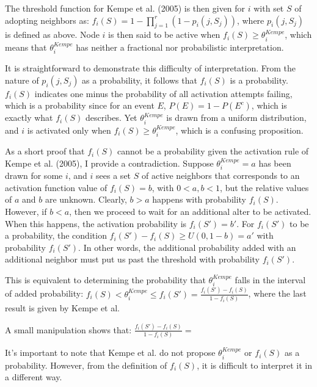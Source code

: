 \documentclass{article}
\begin{document}
The threshold function for Kempe et al. (2005) is then given for $i$ with set $S$ of adopting neighbors as: $f_i(S) = 1 - \prod_{j=1}^r (1 - p_i(j, S_j))$, where $p_i(j, S_j)$ is defined as above. Node $i$ is then said to be active when $f_i(S) \ge \theta_i^{Kempe}$, which means that $\theta_i^{Kempe}$ has neither a fractional nor probabilistic interpretation.

It is straightforward to demonstrate this difficulty of interpretation. From the nature of $p_i(j,S_j)$ as a probability, it follows that $f_i(S)$ is a probability. $f_i(S)$ indicates one minus the probability of all activation attempts failing, which is a probability since for an event $E$, $P(E) = 1 - P(E^c)$, which is exactly what $f_i(S)$ describes. Yet $\theta_i^{Kempe}$ is drawn from a uniform distribution, and $i$ is activated only when $f_i(S) \ge \theta_i^{Kempe}$, which is a confusing proposition.

As a short proof that $f_i(S)$ cannot be a probability given the activation rule of Kempe et al. (2005), I provide a contradiction. Suppose $\theta_i^{Kempe} = a$ has been drawn for some $i$, and $i$ sees a set $S$ of active neighbors that corresponds to an activation function value of $f_i(S) = b$, with $0 < a, b < 1$, but the relative values of $a$ and $b$ are unknown. Clearly, $b \gt a$ happens with probability $f_i(S)$. However, if $b < a$, then we proceed to wait for an additional alter to be activated. When this happens, the activation probability is $f_i(S') = b'$. For $f_i(S')$ to be a probability, the condition $f_i(S') - f_i(S) \ge U(0, 1-b) = a'$ with probability $f_i(S')$. In other words, the additional probability added with an additional neighbor must put us past the threshold with probability $f_i(S')$.

This is equivalent to determining the probability that $\theta_i^{Kempe}$ falls in the interval of added probability: $f_i(S) < \theta_i^{Kempe} \le f_i(S') = \frac{f_i(S') - f_i(S)}{1 - f_i(S)}$, where the last result is given by Kempe et al. 

A small manipulation shows that: $\frac{f_i(S') - f_i(S)}{1 - f_i(S)} = $

It's important to note that Kempe et al. do not propose $\theta_i^{Kempe}$ or $f_i(S)$ as a probability. However, from the definition of $f_i(S)$, it is difficult to interpret it in a different way.
\end{document}
